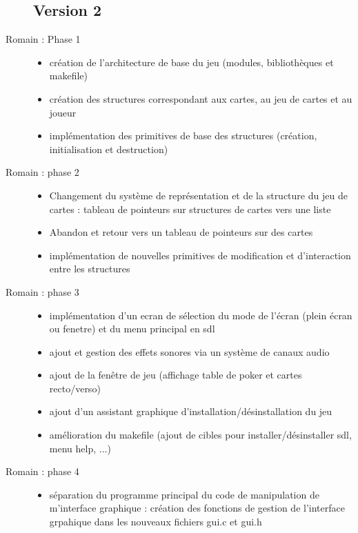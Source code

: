 \documentclass[12pt,a4paper]{article}
\begin{document}
\begin{description}
\subsection{Version 2}
\item[Romain : Phase 1]
{
\begin{itemize}
\item création de l'architecture de base du jeu (modules, bibliothèques et makefile)
\item création des structures correspondant aux cartes, au jeu de cartes et au joueur
\item implémentation des primitives de base des structures (création, initialisation et destruction)
\end{itemize}
}
\item[Romain : phase 2]
{
\begin{itemize}
\item Changement du système de représentation et de la structure du jeu de cartes : tableau de pointeurs sur structures de cartes vers une liste
\item Abandon et retour vers un tableau de pointeurs sur des cartes
\item implémentation de nouvelles primitives de modification et d'interaction entre les structures
\end{itemize}
}
\item[Romain : phase 3]
{
\begin{itemize}
\item implémentation d'un ecran de sélection du mode de l'écran (plein écran ou fenetre) et du menu principal en sdl 
\item ajout et gestion des effets sonores via un système de canaux audio
\item ajout de la fenêtre de jeu (affichage table de poker et cartes recto/verso)
\item ajout d'un assistant graphique d'installation/désinstallation du jeu
\item amélioration du makefile (ajout de cibles pour installer/désinstaller sdl, menu help, ...)
\end{itemize}
}
\item[Romain : phase 4]
{
\begin{itemize}
\item séparation du programme principal du code de manipulation de m'interface graphique : création des fonctions de gestion de l'interface grpahique dans les nouveaux fichiers gui.c et gui.h
\end{itemize}
}


\end{description}
\end{document}
